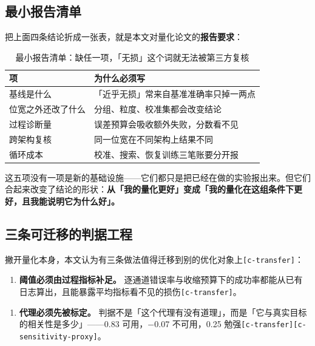 \subsection{最小报告清单}

把上面四条结论折成一张表，就是本文对量化论文的\textbf{报告要求}：


\begin{table}[t]
\centering
\footnotesize
\setlength{\tabcolsep}{4pt}
\caption{最小报告清单：缺任一项，「无损」这个词就无法被第三方复核}
\label{tab:6}
\begin{tabular}{ll}
\toprule
项 & 为什么必须写 \\
\midrule
基线是什么 & 「近乎无损」常来自基准准确率只掉一两点 \\
位宽之外还改了什么 & 分组、粒度、校准集都会改变结论 \\
过程诊断量 & 误差预算会吸收额外失败，分数看不见 \\
跨架构复核 & 同一位宽在不同架构上结果不同 \\
循环成本 & 校准、搜索、恢复训练三笔账要分开报 \\
\bottomrule
\end{tabular}
\end{table}

这五项没有一项是新的基础设施——它们都只是把已经在做的实验报出来。但它们合起来改变了结论的形状：\textbf{从「我的量化更好」变成「我的量化在这组条件下更好，且我能说明它为什么好」。}


\subsection{三条可迁移的判据工程}

撇开量化本身，本文认为有三条做法值得迁移到别的优化对象上{\scriptsize\texttt{[c-\hspace{0pt}transfer]}}：


\begin{enumerate}
  \item \textbf{阈值必须由过程指标补足。} 逐通道错误率与收缩预算下的成功率都能从已有日志算出，且能暴露平均指标看不见的损伤{\scriptsize\texttt{[c-\hspace{0pt}transfer]}}。
\end{enumerate}

\begin{enumerate}
  \item \textbf{代理必须先被标定。} 判据不是「这个代理有没有道理」，而是「它与真实目标的相关性是多少」——0.83 可用，−0.07 不可用，0.25 勉强{\scriptsize\texttt{[c-\hspace{0pt}transfer]}}{\scriptsize\texttt{[c-\hspace{0pt}sensitivity-\hspace{0pt}proxy]}}。
\end{enumerate}

